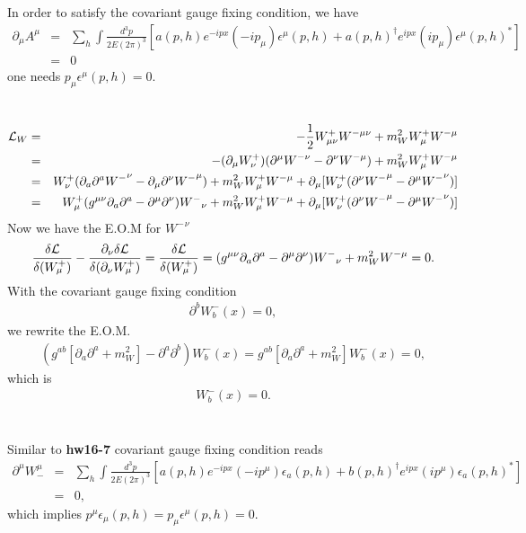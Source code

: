 \documentclass[11pt]{article}
\def\del{{\partial}}
\def\dgr{\dagger}
\begin{document}
\section{ }
In order to satisfy the covariant gauge fixing condition,  we have
\begin{eqnarray}
\del_\mu A^\mu&=&\sum_h \int \frac{d^3p}{2E(2\pi)^3}
[a(p,h) e^{-ipx} (-ip_\mu) \epsilon^\mu (p,h) + a(p,h)^\dgr e^{ipx}(ip_\mu) \epsilon^\mu(p,h)^* ]\\
&=& 0
\end{eqnarray}
one needs $p_\mu \epsilon^\mu(p,h) = 0$.

\section{ }
\begin{eqnarray}
    {\cal L}_{W}
    &=& -\frac{1}{2} W^+_{\mu\nu} W^{- \mu\nu} + m_W^2 W^+_\mu W^{- \mu}\\
    &=& - (\del_\mu W^+_\nu) (\del^\mu W^{-\nu} -\del^\nu W^{-\mu})
      + m_W^2 W^+_\mu W^{-\mu}\\ 
    &=& W^+_\nu (\del_a \del^a {W^-}^\nu -\del_\mu\del^\nu {W^-}^\mu ) + m_W^2 W^+_\mu W^{-\mu} +\del_\mu[W^+_\nu(\del^\nu{W^-}^\mu-\del^\mu {W^-}^\nu)] \\
    &=&W^+_\mu (g^{\mu\nu}\del_a\del^a -\del^\mu\del^\nu ){W^-}_\nu + m_W^2 W^+_\mu W^{-\mu} +\del_\mu[W^+_\nu(\del^\nu{W^-}^\mu-\del^\mu {W^-}^\nu)]
\end{eqnarray}
Now we have the E.O.M for ${W^-}^\nu$
\begin{eqnarray}
    \frac{\delta {\cal L}}{\delta(W^+_\mu)} -\frac{\del_\nu \delta {\cal L}}{\delta(\del_\nu W^+_\mu)}
  =  \frac{\delta {\cal L}}{\delta(W^+_\mu)}
  = (g^{\mu\nu}\del_a\del^a -\del^\mu\del^\nu ){W^-}_\nu+m_W^2 W^{-\mu}=0.
\end{eqnarray}
With the covariant gauge fixing condition
\begin{eqnarray}
    \del^b W^-_b(x) = 0,
\end{eqnarray}
we rewrite the E.O.M.
\begin{eqnarray}
    (g^{ab} [\del_a \del^a+m_W^2] -\del^a \del^b) W^-_b(x) = g^{ab} [\del_a \del^a+m_W^2] W^-_b(x)  =0,
\end{eqnarray}
which is
\begin{eqnarray}
    [ \del_a \del^a + m_W^2 ] W^-_b(x) = 0.
\end{eqnarray}

\section{ }
Similar to {\bf hw16-7} covariant gauge fixing condition reads
\begin{eqnarray}
\del^\mu W_-^\mu&=& \sum_h \int \frac{d^3p}{2E(2\pi)^3}
[ a(p,h) e^{-ipx} (-ip^\mu) \epsilon_a(p,h) + b(p,h)^\dgr e^{ipx} (ip^\mu) \epsilon_a(p,h)^* ] \\
&=& 0,
\end{eqnarray}
which implies $p^\mu \epsilon_\mu(p,h) = p_\mu \epsilon^\mu(p,h)=0$.
\end{document}
